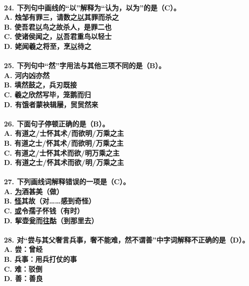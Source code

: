 \documentclass[UTF8]{ctexart} %
\begin{document}
\paragraph{
24. 下列句中画线的“以”解释为“认为，以为”的是（\color{red}C\color{black}）。 \\
    A. 烛邹有罪三，请数之\uline{以}其罪而杀之 \\
    B. 使吾君\uline{以}鸟之故杀人，是罪二也 \\
    C. 使诸侯闻之，\uline{以}吾君重鸟以轻士 \\
    D. 姥闻羲之将至，烹\uline{以}待之
}
\paragraph{
25. 下列句中“然”字用法与其他三项不同的是（\color{red}B\color{black}）。 \\
    A. 河内凶亦然 \\
    B. 填然鼓之，兵刃既接 \\
    C. 羲之欣然写毕，笼鹅而归 \\
    D. 有饿者蒙袂辑屦，贸贸然来
}
\paragraph{
26. 下面句子停顿正确的是（\color{red}B\color{black}）。 \\
    A. 有道之/士怀其术/而欲明/万乘之主 \\
    B. 有道之士/怀其术/而欲明/万乘之主 \\
    C. 有道之/士怀其术而欲/明万乘之主 \\
    D. 有道之士/怀其术而欲/明/万乘之主
}
\paragraph{
27. 下列画线词解释错误的一项是（\color{red}C\color{black}）。 \\
    A. \uline{为}酒甚美（做） \\
    B. \uline{怪}其故（对……感到奇怪） \\
    C. \uline{或}令孺子怀钱（有时） \\
    D. 挈壶瓮而\uline{往}酤（到那里去）
}
\paragraph{
28. 对“尝与其父奢言兵事，奢不能难，然不谓善”中字词解释不正确的是（\color{red}D\color{black}）。 \\
    A. 尝：曾经 \\
    B. 兵事：用兵打仗的事 \\
    C. 难：驳倒 \\
    D. 善：善良
}
\end{document}

